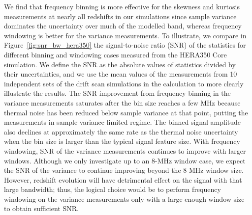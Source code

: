 \documentclass[fleqn,usenatbib]{mnras}
\begin{document}
We find that frequency binning is more effective for the skewness and kurtosis measurements at nearly all redshifts in our simulations since sample variance dominates the uncertainty over much of the modelled band, whereas frequency windowing is better for the variance measurements. To illustrate, we compare in Figure~\ref{fig:snr_bw_hera350} the signal-to-noise ratio (SNR) of the statistics for different binning and windowing cases measured from the HERA350 Core simulation. We define the SNR as the absolute values of statistics divided by their uncertainties, and we use the mean values of the measurements from 10 independent sets of the drift scan simulations in the calculation to more clearly illustrate the results. The SNR improvement from frequency binning in the variance measurements saturates after the bin size reaches a few MHz because thermal noise has been reduced below sample variance at that point, putting the measurements in sample variance limited regime. The binned signal amplitude also declines at approximately the same rate as the thermal noise uncertainty when the bin size is larger than the typical signal feature size. With frequency windowing, SNR of the variance measurements continues to improve with larger windows. Although we only investigate up to an 8-MHz window case, we expect the SNR of the variance to continue improving beyond the 8 MHz window size. However, redshift evolution will have detrimental effect on the signal with that large bandwidth; thus, the logical choice would be to perform frequency windowing on the variance measurements only with a large enough window size to obtain sufficient SNR.
\end{document}
